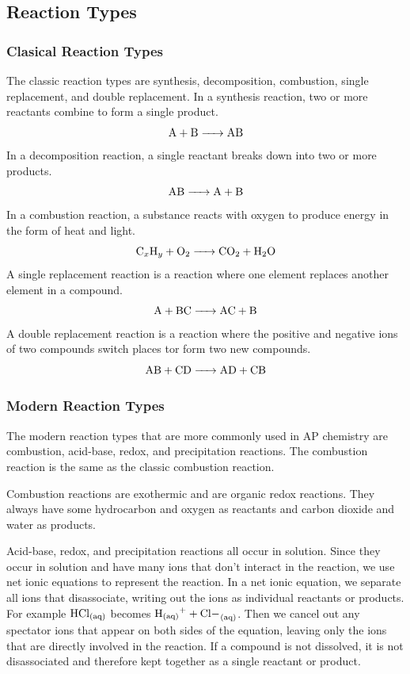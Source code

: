 \subsection{Reaction Types}
\subsubsection{Clasical Reaction Types}
The classic reaction types are synthesis, decomposition, combustion, single replacement, and double replacement. In a synthesis reaction, two or more reactants combine to form a single product.
\[\ce{A + B -> AB}\]
In a decomposition reaction, a single reactant breaks down into two or more products.
\[\ce{AB -> A + B}\]
In a combustion reaction, a substance reacts with oxygen to produce energy in the form of heat and light.
\[\ce{C_xH_y + O2 -> CO2 + H2O}\]
A single replacement reaction is a reaction where one element replaces another element in a compound.
\[\ce{A + BC -> AC + B}\]
A double replacement reaction is a reaction where the positive and negative ions of two compounds switch places tor form two new compounds.
\[\ce{AB + CD -> AD + CB}\]
\subsubsection{Modern Reaction Types}
The modern reaction types that are more commonly used in AP chemistry are combustion, acid-base, redox, and precipitation reactions. The combustion reaction is the same as the classic combustion reaction. 

Combustion reactions are exothermic and are organic redox reactions. They always have some hydrocarbon and oxygen as reactants and carbon dioxide and water as products.

Acid-base, redox, and precipitation reactions all occur in solution. Since they occur in solution and have many ions that don't interact in the reaction, we use net ionic equations to represent the reaction. In a net ionic equation, we separate all ions that disassociate, writing out the ions as individual reactants or products. For example $\ce{HCl_{(aq)}}$ becomes $\ce{H+_{(aq)} + Cl-_{(aq)}}$. Then we cancel out any spectator ions that appear on both sides of the equation, leaving only the ions that are directly involved in the reaction. If a compound is not dissolved, it is not disassociated and therefore kept together as a single reactant or product.  
